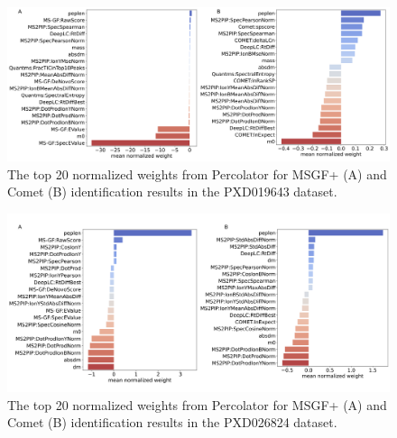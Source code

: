 \documentclass[12pt]{article}
\begin{document}
\begin{figure}[ht!]
	\centering
	\includegraphics[width=1\textwidth]{figures//PXD019643_weights.png}
	\caption{The top 20 normalized weights from Percolator for MSGF+ (A) and Comet (B) identification results in the PXD019643 dataset.}
	\label{fig:PXD019643_features}
\end{figure}

\begin{figure}[ht!]
	\centering
	\includegraphics[width=1\textwidth]{figures//phos_weights.png}
	\caption{The top 20 normalized weights from Percolator for MSGF+ (A) and Comet (B) identification results in the PXD026824 dataset.}
	\label{fig:phospho_features}
\end{figure}
\end{document}
